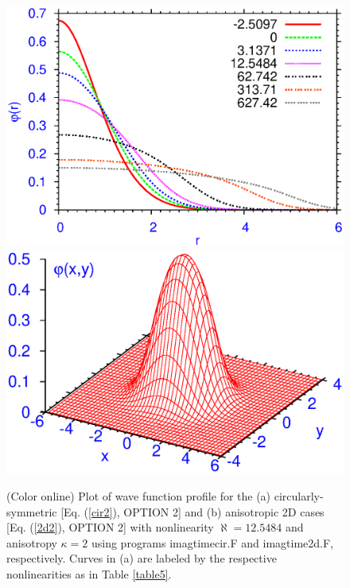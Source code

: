 \documentclass[onecolumn]{elsart3p}
\begin{document}
\begin{figure}[tbp] \begin{center}
{\includegraphics[width=.49\linewidth]{fig3a.ps}}
{\includegraphics[width=.49\linewidth]{fig3b.ps}}
\end{center}
\caption{(Color online) Plot of wave function profile for the (a)
circularly-symmetric [Eq. (\ref{cir2}), OPTION 2]
and
(b)
anisotropic 2D cases [Eq. (\ref{2d2}), OPTION 2]
with nonlinearity $\aleph %
=12.5484$ and anisotropy
$\kappa=2$ using programs imagtimecir.F and imagtime2d.F, respectively.
Curves in (a) are labeled by the respective nonlinearities
as in Table  \ref{table5}.
}
\label{fig3}
\end{figure}
\end{document}
